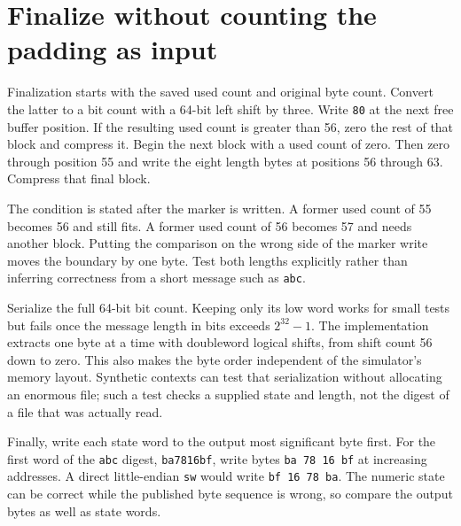 \section{Finalize without counting the padding as input}
Finalization starts with the saved used count and original byte count. Convert the
latter to a bit count with a 64-bit left shift by three. Write \texttt{80} at the next
free buffer position. If the resulting used count is greater than 56, zero the rest
of that block and compress it. Begin the next block with a used count of zero. Then
zero through position 55 and write the eight length bytes at positions 56 through 63.
Compress that final block.

The condition is stated after the marker is written. A former used count of 55 becomes
56 and still fits. A former used count of 56 becomes 57 and needs another block.
Putting the comparison on the wrong side of the marker write moves the boundary by
one byte. Test both lengths explicitly rather than inferring correctness from a short
message such as \texttt{abc}.

Serialize the full 64-bit bit count. Keeping only its low word works for small tests
but fails once the message length in bits exceeds \(2^{32}-1\). The implementation
extracts one byte at a time with doubleword logical shifts, from shift count 56 down
to zero. This also makes the byte order independent of the simulator's memory layout.
Synthetic contexts can test that serialization without allocating an enormous file;
such a test checks a supplied state and length, not the digest of a file that was
actually read.

Finally, write each state word to the output most significant byte first. For the first
word of the \texttt{abc} digest, \texttt{ba7816bf}, write bytes
\texttt{ba 78 16 bf} at increasing addresses. A direct little-endian \texttt{sw}
would write \texttt{bf 16 78 ba}. The numeric state can be correct while the
published byte sequence is wrong, so compare the output bytes as well as state words.
